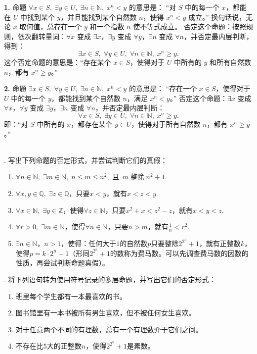 \documentclass[12pt,UTF8,fontset=none]{ctexbook}
\begin{document}
\begin{so}
    \textbf{1.}  命题 $\forall x\in S,\; \exists y\in U,\; \exists n\in\mathbb{N},\; x^n < y$ 的意思是：  
    “对 $S$ 中的每一个 $x$，都能在 $U$ 中找到某个 $y$，并且能找到某个自然数 $n$，使得 $x^n < y$ 成立。”  
    换句话说，无论 $x$ 取何值，总存在一个 $y$ 和一个指数 $n$ 使不等式成立。  
    否定这个命题：按照规则，依次翻转量词：$\forall x$ 变成 $\exists x$，$\exists y$ 变成 $\forall y$，$\exists n$ 变成 $\forall n$，并否定最内层判断，得到：  
    \[
    \exists x\in S,\; \forall y\in U,\; \forall n\in\mathbb{N},\; x^n \ge y.
    \]  
    这个否定命题的意思是：“存在某个 $x\in S$，使得对于 $U$ 中所有的 $y$ 和所有自然数 $n$，都有 $x^n \ge y$。”

    \textbf{2.}  命题 $\exists x\in S,\; \forall y\in U,\; \exists n\in\mathbb{N},\; x^n < y$ 的意思是：  
    “存在一个 $x\in S$，使得对于 $U$ 中的每一个 $y$，都能找到某个自然数 $n$，满足 $x^n < y$。”  
    否定这个命题：$\exists x$ 变成 $\forall x$，$\forall y$ 变成 $\exists y$，$\exists n$ 变成 $\forall n$，并否定最内层判断：  
    \[
    \forall x\in S,\; \exists y\in U,\; \forall n\in\mathbb{N},\; x^n \ge y.
    \]  
    即：“对 $S$ 中所有的 $x$，都存在某个 $y\in U$，使得对于所有自然数 $n$，都有 $x^n \ge y$。”
\end{so}

\begin{xt}
    \mbox{} \\
    . 写出下列命题的否定形式，并尝试判断它们的真假：
    \begin{enumerate}[label=1.\arabic*.,leftmargin=5em]
        \item $\forall n\in\mathbb{N},\; \exists m\in\mathbb{N},\; n \leqslant m \leqslant n^2,\,\, \mbox{且}\,\;m\;\mbox{整除}\; n^2 + 1.$
        \item $\forall x,y\in\mathbb{Q},\; \exists z\in\mathbb{Q}$，只要$x<y$，就有$x<z<y.$
        \item $\forall x\in\mathbb{N},\; \exists y\in\mathbb{Z}$，使得$\forall z\in \mathbb{N}$，只要$x^2+x<z^2-z$，就有$x<y<z.$
        \item $\forall r > 0,\; \exists m\in\mathbb{N}$，使得$\forall n\in\mathbb{N}$，只要$n>m$，就有$\displaystyle \frac{1}{n} < r^2.$\vspace{10pt}
        \item $\exists n\in\mathbb{N}$，$n>1$，使得：任何大于$1$的自然数$p$只要整除$2^{2^n}+1$，就有正整数$k$，使得$p = k\cdot 2^n - 1$（形同$2^{2^n}+1$的数称为费马数。可以先调查费马数的因数的性质，再尝试判断命题真假）。
    \end{enumerate}

    . 将下列语句转为使用符号记录的多层命题，并写出它们的否定形式：
    \begin{enumerate}[label=2.\arabic*.,leftmargin=5em]
        \item 班里每个学生都有一本最喜欢的书。
        \item 图书馆里有一本书被所有男生喜欢，但不被任何女生喜欢。
        \item 对于任意两个不同的有理数，总有一个有理数介于它们之间。
        \item 不存在比$5$大的正整数$n$，使得$2^{2^n}+1$是素数。
    \end{enumerate}
\end{xt}
\end{document}

